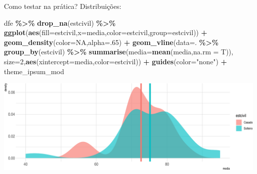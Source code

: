 \documentclass[
  9pt,
  ignorenonframetext,
  aspectratio=169]{beamer}
\newenvironment{Shaded}{\begin{snugshade}}{\end{snugshade}}
\newcommand{\DataTypeTok}[1]{\textcolor[rgb]{0.13,0.29,0.53}{#1}}
\newcommand{\DecValTok}[1]{\textcolor[rgb]{0.00,0.00,0.81}{#1}}
\newcommand{\KeywordTok}[1]{\textcolor[rgb]{0.13,0.29,0.53}{\textbf{#1}}}
\newcommand{\NormalTok}[1]{#1}
\newcommand{\OperatorTok}[1]{\textcolor[rgb]{0.81,0.36,0.00}{\textbf{#1}}}
\newcommand{\OtherTok}[1]{\textcolor[rgb]{0.56,0.35,0.01}{#1}}
\newcommand{\StringTok}[1]{\textcolor[rgb]{0.31,0.60,0.02}{#1}}
\begin{document}
\begin{frame}[fragile]{Como testar na prática? Distribuições:}
\protect\hypertarget{como-testar-na-pruxe1tica-distribuiuxe7uxf5es}{}
\begin{Shaded}
\begin{Highlighting}[]
\NormalTok{dfe }\OperatorTok{\%\textgreater{}\%}\StringTok{ }\KeywordTok{drop\_na}\NormalTok{(estcivil) }\OperatorTok{\%\textgreater{}\%}\StringTok{ }
\StringTok{  }\KeywordTok{ggplot}\NormalTok{(}\KeywordTok{aes}\NormalTok{(}\DataTypeTok{fill=}\NormalTok{estcivil,}\DataTypeTok{x=}\NormalTok{media,}\DataTypeTok{color=}\NormalTok{estcivil,}\DataTypeTok{group=}\NormalTok{estcivil)) }\OperatorTok{+}
\StringTok{  }\KeywordTok{geom\_density}\NormalTok{(}\DataTypeTok{color=}\OtherTok{NA}\NormalTok{,}\DataTypeTok{alpha=}\NormalTok{.}\DecValTok{65}\NormalTok{) }\OperatorTok{+}\StringTok{  }
\StringTok{  }\KeywordTok{geom\_vline}\NormalTok{(}\DataTypeTok{data=}\NormalTok{. }\OperatorTok{\%\textgreater{}\%}\StringTok{ }\KeywordTok{group\_by}\NormalTok{(estcivil) }\OperatorTok{\%\textgreater{}\%}\StringTok{ }\KeywordTok{summarise}\NormalTok{(}\DataTypeTok{media=}\KeywordTok{mean}\NormalTok{(media,}\DataTypeTok{na.rm =}\NormalTok{ T)),}
             \DataTypeTok{size=}\DecValTok{2}\NormalTok{,}\KeywordTok{aes}\NormalTok{(}\DataTypeTok{xintercept=}\NormalTok{media,}\DataTypeTok{color=}\NormalTok{estcivil)) }\OperatorTok{+}\StringTok{ }
\StringTok{  }\KeywordTok{guides}\NormalTok{(}\DataTypeTok{color=}\StringTok{"none"}\NormalTok{) }\OperatorTok{+}\StringTok{ }\NormalTok{theme\_ipsum\_mod}
\end{Highlighting}
\end{Shaded}

\includegraphics{aula_11_files/figure-beamer/unnamed-chunk-1-1.pdf}
\end{frame}
\end{document}
